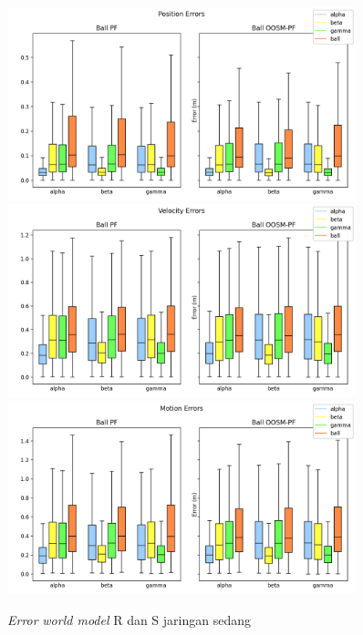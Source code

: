\begin{figure}[p]
    \centering
    \medskip
    \includegraphics[width=0.9\textwidth]{resources/cfg2_AR_AS_error_pos.png}
    \includegraphics[width=0.9\textwidth]{resources/cfg2_AR_AS_error_vel.png}
    \includegraphics[width=0.9\textwidth]{resources/cfg2_AR_AS_error_motion.png}
    \caption{\textit{Error} \textit{world model} R dan S jaringan sedang}
    \label{fig:2-r-s-error}
    \bigskip
\end{figure}

